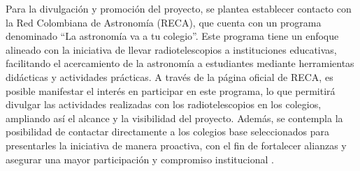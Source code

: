 Para la divulgación y promoción del proyecto, se plantea establecer contacto con
la Red Colombiana de Astronomía (RECA), que cuenta con un programa denominado
``La astronomía va a tu colegio''.
Este programa tiene un enfoque alineado con la iniciativa de llevar
radiotelescopios a instituciones educativas, facilitando el acercamiento de la
astronomía a estudiantes mediante herramientas didácticas y actividades prácticas.
A través de la página oficial de RECA, es posible manifestar el interés en
participar en este programa, lo que permitirá divulgar las actividades realizadas
con los radiotelescopios en los colegios, ampliando así el alcance y la
visibilidad del proyecto.
Además, se contempla la posibilidad de contactar directamente a los colegios
base seleccionados para presentarles la iniciativa de manera proactiva, con el
fin de fortalecer alianzas y asegurar una mayor participación y compromiso
institucional \cite{reca2025}.
